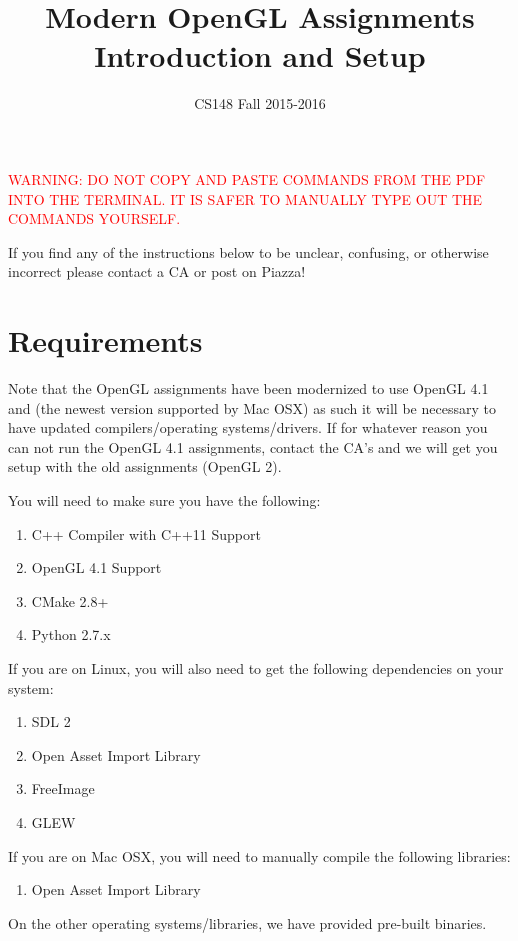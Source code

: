 \documentclass{article}
\begin{document}
\title{Modern OpenGL Assignments Introduction and Setup}
\author{CS148 Fall 2015-2016}
\date{}
\maketitle

\textcolor{red}{WARNING: DO NOT COPY AND PASTE COMMANDS FROM THE PDF INTO THE TERMINAL. IT IS SAFER TO MANUALLY TYPE OUT THE COMMANDS YOURSELF.}

If you find any of the instructions below to be unclear, confusing, or otherwise incorrect please contact a CA or post on Piazza!

\section*{Requirements}

Note that the OpenGL assignments have been modernized to use OpenGL 4.1 and (the newest version supported by Mac OSX) as such it will be necessary to have updated compilers/operating systems/drivers. If for whatever reason you can not run the OpenGL 4.1 assignments, contact the CA's and we will get you setup with the old assignments (OpenGL 2).

You will need to make sure you have the following:
\begin{enumerate}
    \item C++ Compiler with C++11 Support
    \item OpenGL 4.1 Support
    \item CMake 2.8+
    \item Python 2.7.x
\end{enumerate}

If you are on Linux, you will also need to get the following dependencies on your system:
\begin{enumerate}
    \item SDL 2
    \item Open Asset Import Library
    \item FreeImage
    \item GLEW
\end{enumerate}

If you are on Mac OSX, you will need to manually compile the following libraries:
\begin{enumerate}
    \item Open Asset Import Library
\end{enumerate}

On the other operating systems/libraries, we have provided pre-built binaries.
\end{document}
